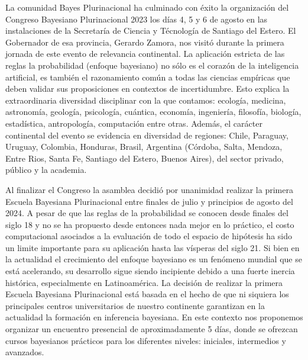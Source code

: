 \documentclass[a4paper,10pt]{letter}
\begin{document}
\begin{letter}
\hspace{1cm}
La comunidad Bayes Plurinacional ha culminado con éxito la organización del Congreso Bayesiano Plurinacional 2023 los días 4, 5 y 6 de agosto en las instalaciones de la Secretaría de Ciencia y Técnología de Santiago del Estero.
%
El Gobernador de esa provincia, Gerardo Zamora, nos visitó durante la primera jornada de este evento de relevancia continental.
%
La aplicación estricta de las reglas la probabilidad (enfoque bayesiano) no sólo es el corazón de la inteligencia artificial, es también el razonamiento común a todas las ciencias empíricas que deben validar sus proposiciones en contextos de incertidumbre.
%
Esto explica la extraordinaria diversidad disciplinar con la que contamos: ecología, medicina, astronomía, geología, psicología, cuántica, economía, ingeniería, filosofía, biología, estadística, antropología, computación entre otras.
%
Además, el carácter continental del evento se evidencia en diversidad de regiones: Chile, Paraguay, Uruguay, Colombia, Honduras, Brasil, Argentina (Córdoba, Salta, Mendoza, Entre Rios, Santa Fe, Santiago del Estero, Buenos Aires), del sector privado, público y la academia.


\hspace{1cm}
Al finalizar el Congreso la asamblea decidió por unanimidad realizar la primera Escuela Bayesiana Plurinacional entre finales de julio y principios de agosto del 2024.
%
A pesar de que las reglas de la probabilidad se conocen desde finales del siglo 18 y no se ha propuesto desde entonces nada mejor en lo práctico, el costo computacional asociados a la evaluación de todo el espacio de hipótesis ha sido un limite importante para su aplicación hasta las vísperas del siglo 21.
%
Si bien en la actualidad el crecimiento del enfoque bayesiano es un fenómeno mundial que se está acelerando, su desarrollo sigue siendo incipiente debido a una fuerte inercia histórica, especialmente en Latinoamérica.
%
La decisión de realizar la primera Escuela Bayesiana Plurinacional está basada en el hecho de que ni siquiera los principales centros universitarios de nuestro continente garantizan en la actualidad la formación en inferencia bayesiana.
%
En este contexto nos proponemos organizar un encuentro presencial de aproximadamente 5 días, donde se ofrezcan cursos bayesianos prácticos para los diferentes niveles: iniciales, intermedios y avanzados.



\end{letter}
\end{document}
